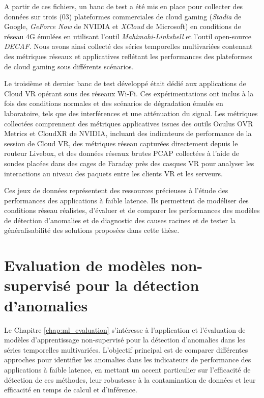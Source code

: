 A partir de ces fichiers, un banc de test a été mis en place pour collecter des données sur trois (03) plateformes commerciales de cloud gaming (\textit{Stadia} de Google, \textit{GeForce Now} de NVIDIA et \textit{XCloud} de Microsoft) en conditions de réseau 4G émulées en utilisant l'outil \textit{Mahimahi-Linkshell} et l'outil open-source \textit{DECAF}. Nous avons ainsi collecté des séries temporelles multivariées contenant des métriques réseaux et applicatives reflétant les performances des plateformes de cloud gaming sous différents scénarios.

Le troisième et dernier banc de test développé était dédié aux applications de Cloud VR opérant sous des réseaux Wi-Fi. Ces expérimentations ont inclus à la fois des conditions normales et des scénarios de dégradation émulés en laboratoire, tels que des interférences et une atténuation du signal. Les métriques collectées comprennent des métriques applicatives issues des outils Oculus OVR Metrics et CloudXR de NVIDIA, incluant des indicateurs de performance de la session de Cloud VR, des métriques réseau capturées directement depuis le routeur Livebox, et des données réseaux brutes PCAP collectées à l’aide de sondes placées dans des cages de Faraday près des casques VR pour analyser les interactions au niveau des paquets entre les clients VR et les serveurs.

Ces jeux de données représentent des ressources précieuses à l'étude des performances des applications à faible latence.  Ils permettent de modéliser des conditions réseau réalistes, d’évaluer et de comparer les performances des modèles de détection d’anomalies et de diagnostic des causes racines et de tester la généralisabilité des solutions proposées dans cette thèse.

\section*{Evaluation de modèles non-supervisé pour la détection d'anomalies}

Le Chapitre \ref{chap:ml_evaluation} s'intéresse à l'application et l'évaluation de modèles d'apprentissage non-supervisé pour la détection d'anomalies dans les séries temporelles multivariées. L’objectif principal est de comparer différentes approches pour identifier les anomalies dans les indicateurs de performance des applications à faible latence, en mettant un accent particulier sur l'efficacité de détection de ces méthodes, leur robustesse à la contamination de données et leur efficacité en temps de calcul et d'inférence.

